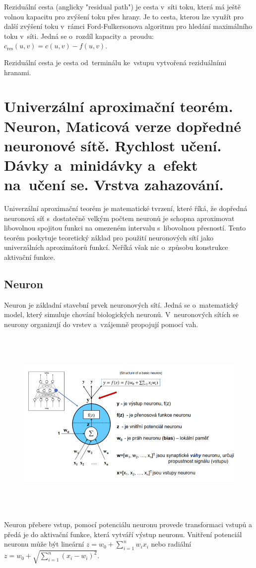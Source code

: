 Reziduální cesta (anglicky "residual path") je cesta v~síti toku, která má ještě volnou kapacitu pro zvýšení toku přes hrany. Je to cesta, kterou lze využít pro další zvýšení toku v~rámci Ford-Fulkersonova algoritmu pro hledání maximálního toku v~síti. Jedná se o~rozdíl kapacity a~proudu: $c_\mathrm{res}(u,v) = c(u,v) - f(u,v)$.

Reziduální cesta je cesta od~terminálu ke~vstupu vytvořená reziduálními hranami.

\clearpage
\section{Univerzální aproximační teorém. Neuron, Maticová verze dopředné neuronové sítě. Rychlost učení. Dávky a~minidávky a~efekt na~učení se. Vrstva zahazování.}

Univerzální aproximační teorém je matematické tvrzení, které říká, že dopředná neuronová síť s~dostatečně velkým počtem neuronů je schopna aproximovat libovolnou spojitou funkci na omezeném intervalu s~libovolnou přesností. Tento teorém poskytuje teoretický základ pro použití neuronových sítí jako univerzálních aproximátorů funkcí.
Neříká však nic o~způsobu konstrukce aktivační funkce.

\subsection{Neuron}

Neuron je základní stavební prvek neuronových sítí. Jedná se o~matematický model, který simuluje chování biologických neuronů. 
V~neuronových sítích se neurony organizují do vrstev a~vzájemně propojují pomocí vah.

\begin{figure}
    \centering
    \includegraphics[height=25em]{images/7_neuron}
\end{figure}
Neuron přebere vstup, pomocí potenciálu neuronu provede transformaci vstupů a předá je do aktivační funkce, která vytváří výstup neuronu.
Vnitření potenciál neuronu může být lineární \(z = w_0 + \sum_{i=1}^n w_i x_i\) nebo radiální \(z = w_0 + \sqrt{\sum_{i=1}^n (x_i - w_i)^2}\).

